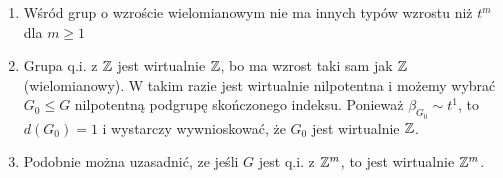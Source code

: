 \begin{conclusion}{}{}
  \begin{enumerate}
    \item Wśród grup o wzroście wielomianowym nie ma innych typów wzrostu niż $t^m$ dla $m\geq1$
    \item Grupa q.i. z $\mathbb{Z}$ jest wirtualnie $\mathbb{Z}$, bo ma wzrost taki sam jak $\mathbb{Z}$ (wielomianowy). W takim razie jest wirtualnie nilpotentna i możemy wybrać $G_0\leq G$ nilpotentną podgrupę skończonego indeksu. Ponieważ $\beta_{G_0}\sim t^1$, to $d(G_0)=1$ i wystarczy wywnioskować, że $G_0$ jest wirtualnie $\mathbb{Z}$.
    \item Podobnie można uzasadnić, ze jeśli $G$ jest q.i. z $\mathbb{Z}^m$, to jest wirtualnie $\mathbb{Z}^m$.
  \end{enumerate}
\end{conclusion}



